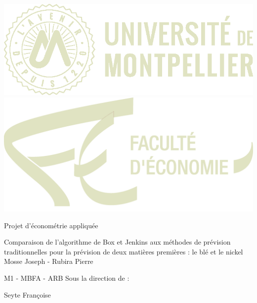 \documentclass[12pt,a4paper]{article}
\begin{document}
\afterpage{\restoregeometry}
\pagecolor{mytan}\afterpage{\nopagecolor}
\thispagestyle{empty}
\begin{center}
\includegraphics{um3.png} \hspace{5em} \includegraphics[scale=0.23]{eco.png} \par
\vfill
\titlefont \textcolor{light}{Projet d'économétrie appliquée}\par\vspace{0.5cm}
\subtitlefont \textcolor{light}{Comparaison de l'algorithme de Box et Jenkins aux méthodes de prévision traditionnelles pour la prévision de deux matières premières : le 
blé et le nickel}
\vfill
\namefont \textcolor{light}{Mosse Joseph - Rubira Pierre}\par\vspace{0.2cm}
\namefont \textcolor{light}{M1 - MBFA - ARB}
\vfill
\namefont \textcolor{light}{Sous la direction de :}\par\vspace{0.2cm}
\namefont \textcolor{light}{Seyte Françoise}
\end{center}

\begin{center}
\end{center}
\end{document}

